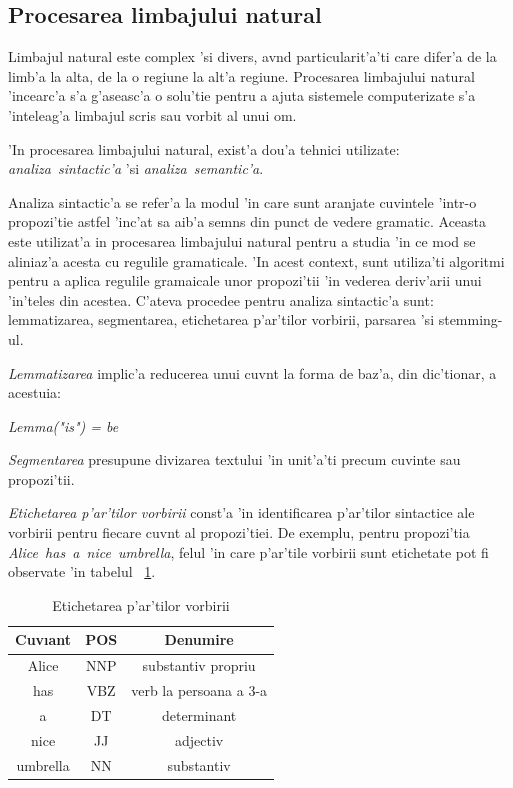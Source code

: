 \documentclass[12pt,a4paper,twoside]{report}
\begin{document}
\subsection{Procesarea limbajului natural}

Limbajul natural este complex 'si divers, av\ia nd particularit'a'ti care difer'a de la limb'a la alta, de la o regiune la alt'a regiune. Procesarea limbajului natural 'incearc'a s'a g'aseasc'a o solu'tie pentru a ajuta sistemele computerizate s'a 'inteleag'a limbajul scris sau vorbit al unui om. 

'In procesarea limbajului natural, exist'a dou'a tehnici utilizate: {\it analiza\ sintactic'a} 'si {\it analiza\ semantic'a}.

Analiza sintactic'a se refer'a la modul 'in care sunt aranjate cuvintele 'intr-o propozi'tie astfel 'inc'at sa aib'a semns din punct de vedere gramatic. Aceasta este utilizat'a in procesarea limbajului natural pentru a studia 'in ce mod se aliniaz'a acesta cu regulile gramaticale. 'In acest context, sunt utiliza'ti algoritmi pentru a aplica regulile gramaicale unor propozi'tii 'in vederea deriv'arii unui 'in'teles din acestea. C'ateva procedee pentru analiza sintactic'a sunt: lemmatizarea, segmentarea, etichetarea p'ar'tilor vorbirii, parsarea 'si stemming-ul.

{\it Lemmatizarea} implic'a reducerea unui cuv\ia nt la forma de baz'a, din dic'tionar, a acestuia: 

\begin{center}
{\it Lemma("is") = be}
\end{center}

{\it Segmentarea} presupune divizarea textului 'in unit'a'ti precum cuvinte sau propozi'tii. 

{\it Etichetarea p'ar'tilor vorbirii} const'a 'in identificarea p'ar'tilor sintactice ale vorbirii pentru fiecare cuv\ia nt al propozi'tiei. De exemplu, pentru propozi'tia {\it Alice\ has\ a\ nice\ umbrella}, felul 'in care p'ar'tile vorbirii sunt etichetate pot fi observate 'in tabelul ~\ref{table:pos_Tag}.


\begin{table}
\caption{Etichetarea p'ar'tilor vorbirii}
\centering                          %
\begin{tabular}{|c|c|c|}          %
\hline\hline                        %
Cuv\i ant& POS & Denumire\\ [0.5ex]   %
\hline                              %
Alice & NNP & substantiv propriu \\[1ex]    
has & VBZ & verb la persoana a 3-a \\[1ex]%
a & DT & determinant\\[1ex]
nice & JJ & adjectiv\\[1ex]
umbrella & NN & substantiv\\[1ex]
\hline                              
\end{tabular}
\label{table:pos_Tag} 
\end{table}
\end{document}
